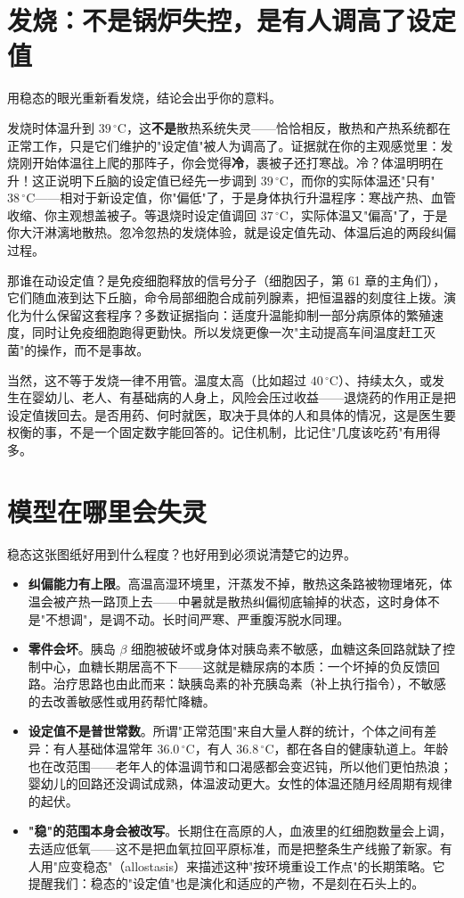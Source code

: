 \section{发烧：不是锅炉失控，是有人调高了设定值}

用稳态的眼光重新看发烧，结论会出乎你的意料。

发烧时体温升到 $39\,^{\circ}\mathrm{C}$，这\textbf{不是}散热系统失灵——恰恰相反，散热和产热系统都在正常工作，只是它们维护的"设定值"被人为调高了。证据就在你的主观感觉里：发烧刚开始体温往上爬的那阵子，你会觉得\textbf{冷}，裹被子还打寒战。冷？体温明明在升！这正说明下丘脑的设定值已经先一步调到 $39\,^{\circ}\mathrm{C}$，而你的实际体温还"只有"$38\,^{\circ}\mathrm{C}$——相对于新设定值，你"偏低"了，于是身体执行升温程序：寒战产热、血管收缩、你主观想盖被子。等退烧时设定值调回 $37\,^{\circ}\mathrm{C}$，实际体温又"偏高"了，于是你大汗淋漓地散热。忽冷忽热的发烧体验，就是设定值先动、体温后追的两段纠偏过程。

那谁在动设定值？是免疫细胞释放的信号分子（细胞因子，第 61 章的主角们），它们随血液到达下丘脑，命令局部细胞合成前列腺素，把恒温器的刻度往上拨。演化为什么保留这套程序？多数证据指向：适度升温能抑制一部分病原体的繁殖速度，同时让免疫细胞跑得更勤快。所以发烧更像一次"主动提高车间温度赶工灭菌"的操作，而不是事故。

当然，这不等于发烧一律不用管。温度太高（比如超过 $40\,^{\circ}\mathrm{C}$）、持续太久，或发生在婴幼儿、老人、有基础病的人身上，风险会压过收益——退烧药的作用正是把设定值拨回去。是否用药、何时就医，取决于具体的人和具体的情况，这是医生要权衡的事，不是一个固定数字能回答的。记住机制，比记住"几度该吃药"有用得多。

\section{模型在哪里会失灵}

稳态这张图纸好用到什么程度？也好用到必须说清楚它的边界。

\begin{itemize}[itemsep=2pt]
\item \textbf{纠偏能力有上限}。高温高湿环境里，汗蒸发不掉，散热这条路被物理堵死，体温会被产热一路顶上去——中暑就是散热纠偏彻底输掉的状态，这时身体不是"不想调"，是调不动。长时间严寒、严重腹泻脱水同理。
\item \textbf{零件会坏}。胰岛 $\beta$ 细胞被破坏或身体对胰岛素不敏感，血糖这条回路就缺了控制中心，血糖长期居高不下——这就是糖尿病的本质：一个坏掉的负反馈回路。治疗思路也由此而来：缺胰岛素的补充胰岛素（补上执行指令），不敏感的去改善敏感性或用药帮忙降糖。
\item \textbf{设定值不是普世常数}。所谓"正常范围"来自大量人群的统计，个体之间有差异：有人基础体温常年 $36.0\,^{\circ}\mathrm{C}$，有人 $36.8\,^{\circ}\mathrm{C}$，都在各自的健康轨道上。年龄也在改范围——老年人的体温调节和口渴感都会变迟钝，所以他们更怕热浪；婴幼儿的回路还没调试成熟，体温波动更大。女性的体温还随月经周期有规律的起伏。
\item \textbf{"稳"的范围本身会被改写}。长期住在高原的人，血液里的红细胞数量会上调，去适应低氧——这不是把血氧拉回平原标准，而是把整条生产线搬了新家。有人用"应变稳态"（allostasis）来描述这种"按环境重设工作点"的长期策略。它提醒我们：稳态的"设定值"也是演化和适应的产物，不是刻在石头上的。
\end{itemize}

